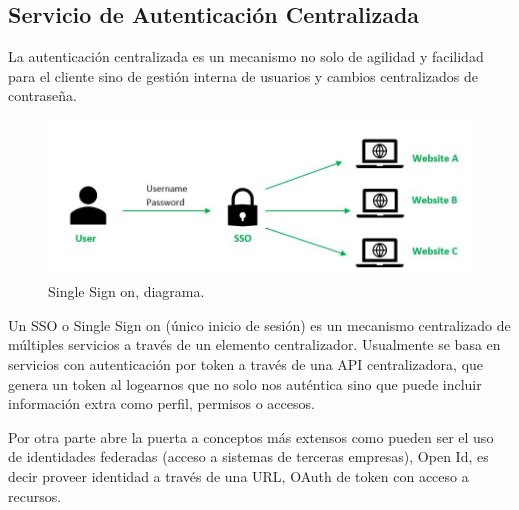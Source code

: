 \subsection{Servicio de Autenticación Centralizada}
La autenticación centralizada es un mecanismo no solo de agilidad y facilidad para el cliente sino de gestión interna de usuarios y cambios centralizados de contraseña. 
\begin{figure}[!htb]
\begin{center}
\includegraphics[width=1\textwidth]{./figuras/sso.jpg}
\caption{Single Sign on, diagrama\cite{i_sso}.}
\label{F:sso}
\end{center}
\end{figure}
Un SSO o Single Sign on (único inicio de sesión) es un mecanismo centralizado de múltiples servicios a través de un elemento centralizador. Usualmente se basa en servicios con autenticación por token a través de una API centralizadora, que genera un token al logearnos que no solo nos auténtica sino que puede incluir información extra como perfil, permisos o accesos. 

Por otra parte abre la puerta a conceptos más extensos como pueden ser el uso de identidades federadas (acceso a sistemas de terceras empresas),  Open Id, es decir proveer identidad a través de una URL, OAuth de token con acceso a recursos.

